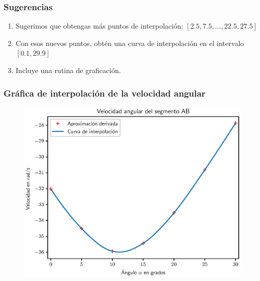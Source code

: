 \documentclass[12pt]{beamer}
\begin{document}
\begin{frame}
\frametitle{Sugerencias}
\begin{enumerate}[<+->]
\item Sugerimos que obtengas más puntos de interpolación: $[2.5, 7.5, \ldots, 22.5, 27.5]$
\item Con esos nuevos puntos, obtén una curva de interpolación en el intervalo $[0.1, 29.9]$
\item Incluye una rutina de graficación.
\end{enumerate}
\end{frame}
\begin{frame}
\frametitle{Gráfica de interpolación de la velocidad angular}
\begin{figure}
    \centering
    \includegraphics[scale=0.55]{Imagenes/diferenciacion_ejercicio_segmento_02.eps}
\end{figure}
\end{frame}
\end{document}
